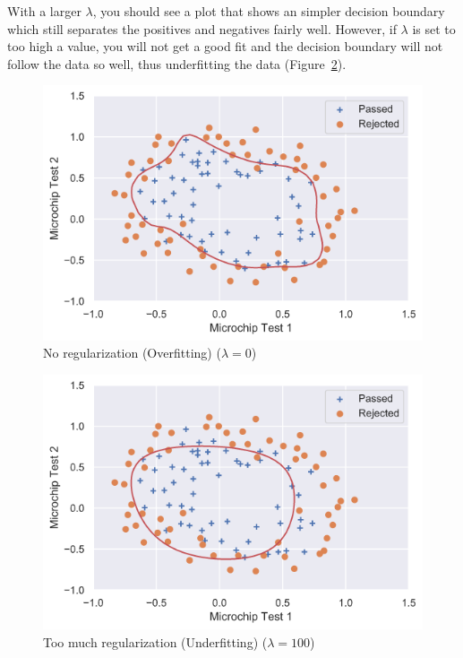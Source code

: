 \documentclass[12pt]{article}
\begin{document}
With a larger $\lambda$, you should see a plot that shows an simpler decision boundary which still separates the positives and negatives fairly well. However, if $\lambda$ is set to too high a value, you will not get a good fit and the decision boundary will not follow the data so well, thus underfitting the data (Figure~\ref{fig:bound10}).

\begin{figure}[h!]
  \centering
  \includegraphics[scale=0.6]{bound0.png}
  \caption{No regularization (Overfitting) ($\lambda=0$)}
  \label{fig:bound0}
\end{figure}

\begin{figure}[h!]
  \centering
  \includegraphics[scale=0.6]{bound10.png}
  \caption{Too much regularization (Underfitting) ($\lambda=100$)}
  \label{fig:bound10}
\end{figure}
\end{document}
